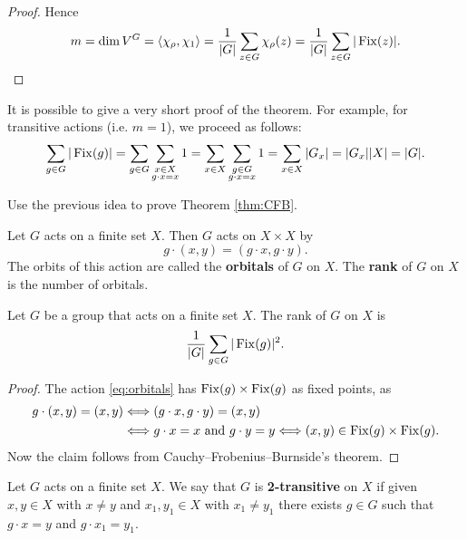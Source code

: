 \begin{proof}
    Hence 
    \[
    m=\dim V^G=\langle\chi_\rho,\chi_1\rangle=\frac{1}{|G|}\sum_{z\in G}\chi_\rho(z)
    =\frac{1}{|G|}\sum_{z\in G}|\operatorname{Fix}(z)|.\qedhere 
    \]
\end{proof}

It is possible to give a very short proof of the theorem. For example, 
for transitive actions (i.e. $m=1$), we proceed as follows:
\[
\sum_{g\in G}|\operatorname{Fix}(g)|=\sum_{g\in G}\sum_{\substack{x\in X\\g\cdot x=x}}1
=\sum_{x\in X}\sum_{\substack{g\in G\\g\cdot x=x}}1
=\sum_{x\in X}|G_x|=|G_x||X|=|G|.
\]

\begin{exercise}
\label{xca:CFB}
    Use the previous idea to prove Theorem \ref{thm:CFB}. 
\end{exercise}

Let $G$ acts on a finite set $X$. Then $G$ acts
on $X\times X$ by
\begin{equation}
    \label{eq:orbitals}
    g\cdot (x,y)=(g\cdot x,g\cdot y).
\end{equation}
The orbits of this action are called
the \textbf{orbitals} of $G$ on $X$. The \textbf{rank} 
of $G$ on $X$ is the number of orbitals. 

\begin{proposition}
    Let $G$ be a group that acts on a finite set $X$.
    The rank of $G$ on $X$ is 
    \[
    \frac{1}{|G|}\sum_{g\in G}|\operatorname{Fix}(g)|^2.
    \]
\end{proposition}

\begin{proof}
    The action \eqref{eq:orbitals} has 
    $\operatorname{Fix}(g)\times\operatorname{Fix}(g)$ as fixed points, as 
    \begin{align*}
        g\cdot (x,y)=(x,y)&\Longleftrightarrow
        (g\cdot x,g\cdot y)=(x,y)\\
        &\Longleftrightarrow g\cdot x=x\text{ and }g\cdot y=y\Longleftrightarrow
        (x,y)\in\operatorname{Fix}(g)\times\operatorname{Fix}(g).
    \end{align*}
    Now the claim follows from Cauchy--Frobenius--Burnside's theorem. 
\end{proof}

\begin{definition}
    Let $G$ acts on a finite set $X$. 
    We say that $G$ is \textbf{2-transitive} on $X$ 
    if given $x,y\in X$ with $x\ne y$ and 
    $x_1,y_1\in X$ with $x_1\ne y_1$ there exists 
    $g\in G$ such that $g\cdot x=y$ and $g\cdot x_1=y_1$. 
\end{definition}


